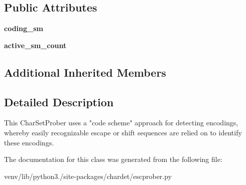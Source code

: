 \subsection*{Public Attributes}
\begin{DoxyCompactItemize}
\item 
\mbox{\label{classchardet_1_1escprober_1_1_esc_char_set_prober_ae5b4be18973a17cfa77b748f48f63fd0}} 
{\bfseries coding\+\_\+sm}
\item 
\mbox{\label{classchardet_1_1escprober_1_1_esc_char_set_prober_a45bf5af5d2d01daed2880b63d3002e9e}} 
{\bfseries active\+\_\+sm\+\_\+count}
\end{DoxyCompactItemize}
\subsection*{Additional Inherited Members}


\subsection{Detailed Description}
\begin{DoxyVerb}This CharSetProber uses a "code scheme" approach for detecting encodings,
whereby easily recognizable escape or shift sequences are relied on to
identify these encodings.
\end{DoxyVerb}
 

The documentation for this class was generated from the following file\+:\begin{DoxyCompactItemize}
\item 
venv/lib/python3./site-\/packages/chardet/escprober.\+py\end{DoxyCompactItemize}
